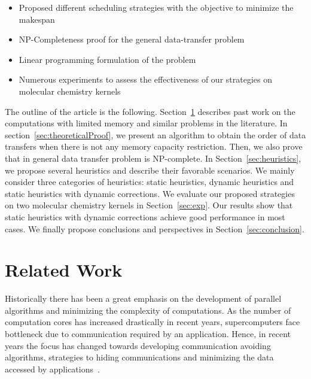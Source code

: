 \documentclass[sigconf]{acmart}
\begin{document}
	
	\renewcommand{\labelitemi}{$\bullet$}
	\begin{itemize}
		\item Proposed different scheduling strategies with the objective to minimize the makespan
		\item NP-Completeness proof for the general data-transfer problem 
		\item Linear programming formulation of the problem
		\item Numerous experiments to assess the effectiveness of our strategies on molecular chemistry kernels 
	\end{itemize}
	
	The outline of the article is the following. Section~\ref{sec:relatedWork} describes past work on the computations with limited memory and similar problems in the literature. In section~\ref{sec:theoreticalProof}, we present an algorithm to obtain the order of data transfers when there is not any memory capacity restriction. Then, we also prove that in general data transfer problem is NP-complete. In Section~\ref{sec:heuristics}, we propose several heuristics and describe their favorable scenarios. We mainly consider three categories of heuristics: static heuristics, dynamic heuristics and static heuristics with dynamic corrections. We evaluate our proposed strategies on two molecular chemistry kernels in Section~\ref{sec:exp}. Our results show that static heuristics with dynamic corrections achieve good performance in most cases. We finally propose conclusions and perspectives in Section~\ref{sec:conclusion}.
	
	\section{Related Work}
	\label{sec:relatedWork}
	
	Historically there has been a great emphasis on the development of parallel algorithms and minimizing the complexity of computations. As the number of computation cores has increased drastically in recent years, supercomputers face bottleneck due to communication required by an application. Hence, in recent years the focus has changed towards developing communication avoiding algorithms, strategies to hiding communications and minimizing the data accessed by applications~\cite{yelick2016}. 
	
\end{document}
